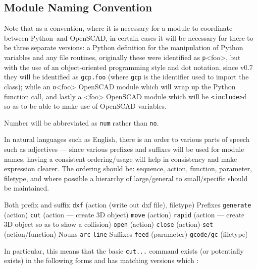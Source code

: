 \documentclass{ltxdoc}
\begin{document}
\subsection{Module Naming Convention}

Note that as a convention, where it is necessary for a module to coordinate between Python~and OpenSCAD, in certain cases it will be necessary for there to be three separate  versions: a Python definition for the manipulation of Python variables and any file routines, originally these were identified as \texttt{p}<foo>, but with the use of an object-oriented programming style and dot notation, since v0.7 they will be identified as \verb|gcp.foo| (where \verb|gcp| is the identifier used to import the class); while an \texttt{o}<foo> OpenSCAD module which will wrap up the Python function call, and lastly a <foo> OpenSCAD module which will be \texttt{<include>}d so as to be able to make use of OpenSCAD variables.

Number will be abbreviated as \verb|num| rather than \verb|no|.

In natural languages such as English, there is an order to various parts of speech such as adjectives 
--- since various prefixes and suffixes will be used for module names, having a consistent ordering/usage will help in consistency and make expression clearer. The ordering should be: sequence, action, function, parameter, filetype, and where possible a hierarchy of large/general to small/specific should be maintained.

\begin{outline}
\1 Both prefix and suffix
\2 \texttt{dxf} (action (write out dxf file), filetype)
\1 Prefixes
\2 \texttt{generate} (action)
\2 \texttt{cut} (action --- create 3D object)
\2 \texttt{move} (action)
\2 \texttt{rapid} (action --- create 3D object so as to show a collision)
\2 \texttt{open} (action)
\2 \texttt{close} (action)
\2 \texttt{set} (action/function)
\1 Nouns
\2 \texttt{arc}
\2 \texttt{line}
\1 Suffixes
\2 \texttt{feed} (parameter)
\2 \texttt{gcode/gc} (filetype)
\end{outline}

\noindent In particular, this means that the basic \verb|cut...| command exists (or potentially exists) in the following forms and has matching versions which :
\end{document}
